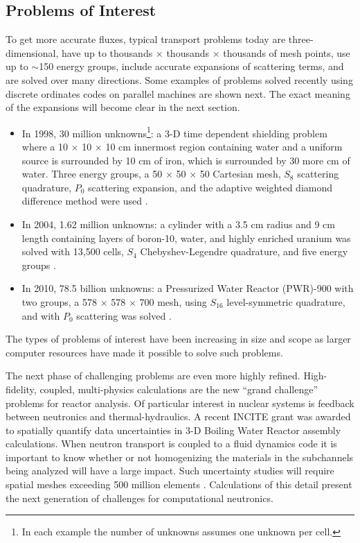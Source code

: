 \subsection{Problems of Interest}
To get more accurate fluxes, typical transport problems today are three-dimensional, have up to thousands $\times$ thousands $\times$ thousands of mesh points, use up to $\sim$150 energy groups, include accurate expansions of scattering terms, and are solved over many directions. Some examples of problems solved recently using discrete ordinates codes on parallel machines are shown next. The exact meaning of the expansions will become clear in the next section.
\begin{itemize}
  \item In 1998, 30 million unknowns\footnote{In each example the number of unknowns assumes one unknown per cell.}: a 3-D time dependent shielding problem where a 10 $\times$ 10 $\times$ 10 cm innermost region containing water and a uniform source is surrounded by 10 cm of iron, which is surrounded by 30 more cm of water. Three energy groups, a 50 $\times$ 50 $\times$ 50 Cartesian mesh, $S_{8}$ scattering quadrature, $P_{0}$ scattering expansion, and the adaptive weighted diamond difference method were used \cite{Alcouffe1998}.
  \item In 2004, 1.62 million unknowns: a cylinder with a 3.5 cm radius and 9 cm length containing layers of boron-10, water, and highly enriched uranium was solved with 13,500 cells, $S_{4}$ Chebyshev-Legendre quadrature, and five energy groups \cite{Warsa2004a}. 
  \item In 2010, 78.5 billion unknowns: a Pressurized Water Reactor (PWR)-900 with two groups, a 578 $\times$ 578 $\times$ 700 mesh, using $S_{16}$ level-symmetric quadrature, and with $P_{0}$ scattering was solved \cite{Davidson2010}. 
\end{itemize}
%
The types of problems of interest have been increasing in size and scope as larger computer resources have made it possible to solve such problems. 

The next phase of challenging problems are even more highly refined. High-fidelity, coupled, multi-physics calculations are the new ``grand challenge'' problems for reactor analysis. Of particular interest in nuclear systems is feedback between neutronics and thermal-hydraulics. A recent INCITE grant was awarded to spatially quantify data uncertainties in 3-D Boiling Water Reactor assembly calculations. When neutron transport is coupled to a fluid dynamics code it is important to know whether or not homogenizing the materials in the subchannels being analyzed will have a large impact. Such uncertainty studies will require spatial meshes exceeding 500 million elements \cite{Evans2009a}. Calculations of this detail present the next generation of challenges for computational neutronics. 


